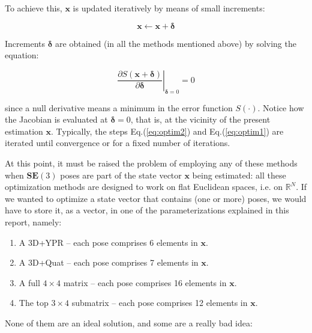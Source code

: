 \documentclass[a4paper,11pt]{report}
\newcommand{\DEL}{{\bm{\delta}}}
\begin{document}
To achieve this, $\mathbf{x}$ is updated iteratively by means of small increments:

\begin{equation}
\label{eq:optim1}
 \mathbf{x}  \leftarrow \mathbf{x} + \DEL
\end{equation}

Increments $\DEL$ are obtained 
(in all the methods mentioned above) 
by solving the equation:

\begin{equation}
\label{eq:optim2}
\left. \frac{\partial S(\mathbf{x} + \DEL )}{\partial \DEL } 
\right|_{\DEL=0}
= 0
\end{equation}

\noindent since a null derivative means a minimum in the error function $S(\cdot)$.
Notice how the Jacobian is evaluated at $\DEL=0$, that is, at the vicinity of 
the present estimation $\mathbf{x}$.
Typically, the steps Eq.(\ref{eq:optim2}) and Eq.(\ref{eq:optim1}) are 
iterated until convergence or for a fixed number of iterations.

At this point, it must be raised the problem of employing any of 
these methods when $\mathbf{SE}(3)$ poses
are part of the state vector $\mathbf{x}$ being estimated: 
all these optimization methods are designed to work on flat Euclidean spaces, i.e. on $\mathbb{R}^N$.
If we wanted to optimize a state vector that contains (one or more) poses, 
we would have to store it, as a vector, in one of the parameterizations explained in this report, namely:

\begin{enumerate}
 \item A 3D+YPR -- each pose comprises 6 elements in $\mathbf{x}$.
 \item A 3D+Quat -- each pose comprises 7 elements in $\mathbf{x}$.
 \item A full $4\times 4$ matrix -- each pose comprises 16 elements in $\mathbf{x}$.
 \item The top $3\times 4$ submatrix -- each pose comprises 12 elements in $\mathbf{x}$.
\end{enumerate}


None of them are an ideal solution, and some are a really bad idea:
\end{document}
